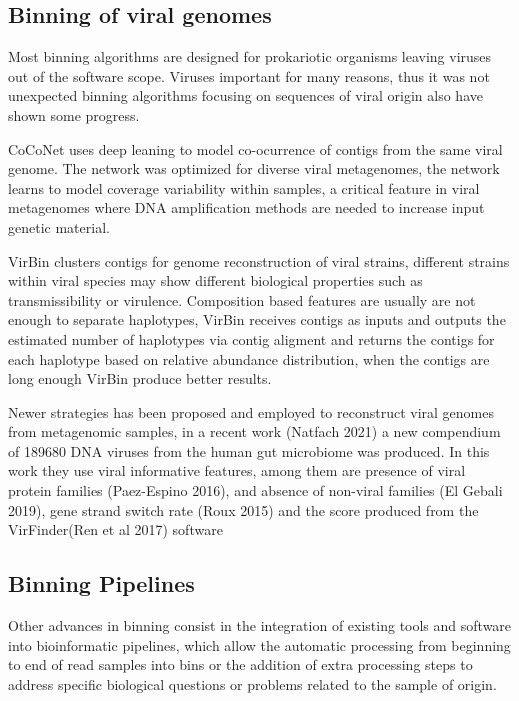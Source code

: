 \documentclass{article}
\begin{document}
\subsection{Binning of viral genomes}

Most binning algorithms are designed for prokariotic organisms leaving viruses out of the software scope. Viruses important for many reasons, thus it was not unexpected binning algorithms focusing on sequences of viral origin also have shown some progress. 

CoCoNet uses deep leaning to model co-ocurrence of contigs from the same viral genome. The network was optimized for diverse viral metagenomes, the network learns to model coverage variability within samples, a critical feature in viral metagenomes where DNA amplification methods are needed to increase input genetic material.

VirBin clusters contigs for genome reconstruction of viral strains, different strains within viral species may show different biological properties such as transmissibility or virulence. Composition based features are usually are not enough to separate haplotypes, VirBin receives contigs as inputs and outputs the estimated number of haplotypes via contig aligment and returns the contigs for each haplotype based on relative abundance distribution, when the contigs are long enough VirBin produce better results.

Newer strategies has been proposed and employed to reconstruct viral genomes from metagenomic samples, in a recent work (Natfach 2021) a new compendium of 189680 DNA viruses from the human gut microbiome was produced. In this work they use viral informative features, among them are presence of viral protein families (Paez-Espino 2016), and absence of non-viral families (El Gebali 2019), gene strand switch rate (Roux 2015) and the score produced from the VirFinder(Ren et al 2017) software  

\subsection{Binning Pipelines}
Other advances in binning consist in the integration of existing tools and software into bioinformatic pipelines, which  allow the automatic processing from beginning to end of read samples into bins or the addition of extra processing steps to address specific biological questions or problems related to the sample of origin.
\end{document}
